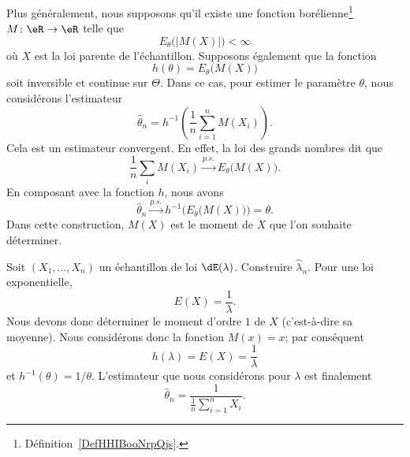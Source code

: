 Plus généralement, nous supposons qu'il existe une fonction borélienne\footnote{Définition~\ref{DefHHIBooNrpQjs}.} \( M\colon \eR\to \eR\) telle que
\begin{equation}
	E_{\theta}\big( | M(X) | \big)<\infty
\end{equation}
où \( X\) est la loi parente de l'échantillon. Supposons également que la fonction
\begin{equation}
	h(\theta)=E_{\theta}\big( M(X) \big)
\end{equation}
soit inversible et continue sur \( \Theta\). Dans ce cas, pour estimer le paramètre \( \theta\), nous considérons l'estimateur
\begin{equation}
	\hat\theta_n=h^{-1}\left( \frac{1}{ n }\sum_{i=1}^nM(X_i) \right).
\end{equation}
Cela est un estimateur convergent. En effet, la loi des grands nombres dit que
\begin{equation}
	\frac{1}{ n }\sum_iM(X_i)\stackrel{p.s.}{\longrightarrow}E_{\theta}\big( M(X) \big).
\end{equation}
En composant avec la fonction \( h\), nous avons
\begin{equation}
	\hat\theta_n\stackrel{p.s.}{\longrightarrow}h^{-1}\Big( E_{\theta}\big( M(X) \big) \Big)=\theta.
\end{equation}
Dans cette construction, \( M(X)\) est le moment de \( X\) que l'on souhaite déterminer.

\begin{example}
	Soit \( (X_1,\ldots,X_n)\) un échantillon de loi \( \dE(\lambda)\). Construire \( \hat\lambda_n\). Pour une loi exponentielle,
	\begin{equation}
		E(X)=\frac{1}{ \lambda }.
	\end{equation}
	Nous devons donc déterminer le moment d'ordre \( 1\) de \( X\) (c'est-à-dire sa moyenne). Nous considérons donc la fonction \( M(x)=x\); par conséquent
	\begin{equation}
		h(\lambda)=E(X)=\frac{1}{ \lambda }
	\end{equation}
	et \( h^{-1}(\theta)=1/\theta\). L'estimateur que nous considérons pour \( \lambda\) est finalement
	\begin{equation}
		\hat\theta_n=\frac{1}{ \frac{1}{ n }\sum_{i=1}^nX_i }.
	\end{equation}
\end{example}

